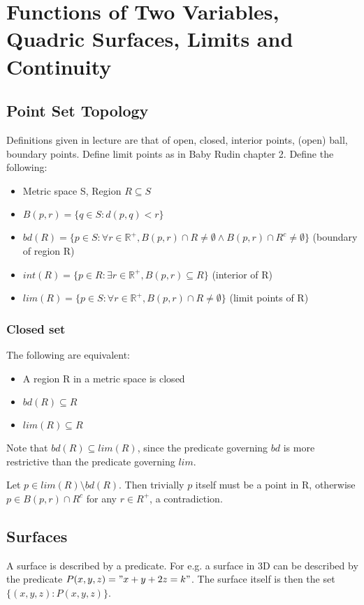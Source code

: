\documentclass{article}
\begin{document}
\section{Functions of Two Variables, Quadric Surfaces, Limits and Continuity}

\subsection{Point Set Topology}
Definitions given in lecture are that of open, closed, interior points, (open) ball, boundary points.
Define limit points as in Baby Rudin chapter 2.
Define the following:
\begin{itemize}
	\item Metric space S, Region $R\subseteq S$ 
	\item $B(p, r) = \{q\in S : d(p,q)<r\}$ 
	\item $bd(R) = \{p\in S : \forall r\in \mathbb{R}^+, B(p,r) \cap R\neq \emptyset \land B(p,r)\cap R^c\neq \emptyset \}$ (boundary of region R)
	\item $int(R) = \{p\in R : \exists r\in \mathbb{R}^+, B(p,r) \subseteq R\}$ (interior of R)
	\item $lim(R) = \{p\in S :  \forall r\in \mathbb{R}^+, B(p,r) \cap R\neq \emptyset\}$ (limit points of R)
\end{itemize}

\subsubsection{Closed set}
The following are equivalent:\\
\begin{itemize}
	\item A region R in a metric space is closed
	\item $bd(R)\subseteq R$
	\item $lim(R)\subseteq R$
\end{itemize}
Note that $bd(R)\subseteq lim(R)$, since the predicate governing $bd$ is more restrictive than the predicate governing $lim$.

Let $p \in lim(R)\setminus bd(R)$. Then trivially $p$ itself must be a point in R, otherwise $p\in B(p, r)\cap R^c$ for any $r\in R^+$, a contradiction.

\subsection{Surfaces}
A surface is described by a predicate. For e.g. a surface in 3D can be described by the predicate $P(x,y,z)="x+y+2z=k"$. The surface itself is then the set $\{(x,y,z):P(x,y,z)\}$.
\end{document}
